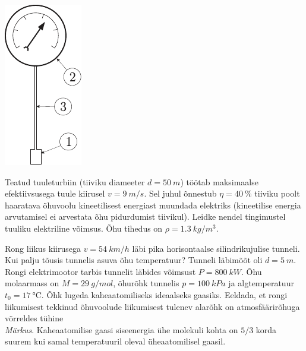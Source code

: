 \documentclass[10pt]{article}
\begin{document}
{\begin{center}
	\includegraphics[width=0.25\linewidth]{2006-v2g-05-yl}
\end{center}
\probend
\bigskip


Teatud tuuleturbiin (tiiviku diameeter $d = \SI{50}{m}$) töötab maksimaalse efektiivsusega tuule kiirusel $v = \SI{9}{m/s}$. Sel juhul õnnestub $\eta = \SI{40}{\%}$ tiiviku poolt haaratava õhuvoolu kineetilisest energiast muundada elektriks (kineetilise energia arvutamisel ei arvestata õhu pidurdumist tiivikul). Leidke nendel tingimustel tuuliku elektriline võimsus. Õhu tihedus on $\rho = \SI{1,3}{kg/m^3}$.
\probend
\bigskip


Rong liikus kiirusega $v=\SI{54}{km/h}$ läbi pika horisontaalse silindrikujulise tunneli.
Kui palju tõusis tunnelis asuva õhu temperatuur? Tunneli läbimõõt oli $d=\SI{5}{m}$.
Rongi elektrimootor tarbis tunnelit läbides võimsust $P=\SI{800}{kW}$.
Õhu molaarmass on $M=\SI{29}{g/mol}$, õhurõhk tunnelis $p=\SI{100}{kPa}$ ja algtemperatuur $t_0=\SI{17}{\degreeCelsius}$.
Õhk lugeda kaheaatomiliseks ideaalseks gaasiks. Eeldada, et rongi liikumisest tekkinud õhuvoolude liikumisest tulenev alarõhk on atmosfäärirõhuga võrreldes tühine\\
\emph{Märkus}. Kaheaatomilise gaasi siseenergia ühe molekuli kohta on $5/3$ korda suurem kui samal temperatuuril oleval üheaatomilisel gaasil.
\probend
\bigskip


}
\end{document}
